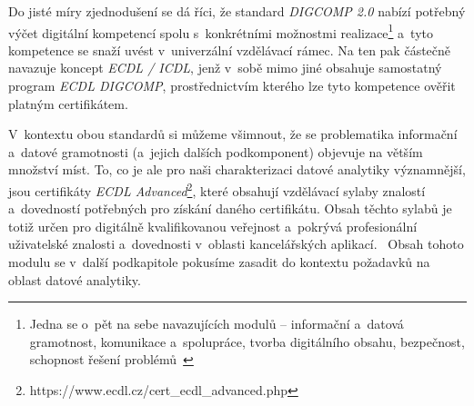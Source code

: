 Do jisté míry zjednodušení se dá říci, že standard \emph{DIGCOMP 2.0} nabízí potřebný výčet digitální kompetencí spolu s~konkrétními možnostmi realizace\footnote{Jedna se o~pět na sebe navazujících modulů – informační a~datová gramotnost, komunikace a~spolupráce, tvorba digitálního obsahu, bezpečnost, schopnost řešení problémů~\parencite{digicomp17}} a~tyto kompetence se snaží uvést v~univerzální vzdělávací rámec. Na ten pak částečně navazuje koncept \emph{ECDL / ICDL}, jenž v~sobě mimo jiné obsahuje samostatný program \emph{ECDL DIGCOMP}, prostřednictvím kterého lze tyto kompetence ověřit platným certifikátem.~\parencite{chabera21}

V~kontextu obou standardů si můžeme všimnout, že se problematika informační a~datové gramotnosti (a~jejich dalších podkomponent) objevuje na větším množství míst. To, co je ale pro naši charakterizaci datové analytiky významnější, jsou certifikáty \emph{ECDL Advanced}\footnote{https://www.ecdl.cz/cert\_ecdl\_advanced.php}, které obsahují vzdělávací sylaby znalostí a~dovedností potřebných pro získání daného certifikátu. Obsah těchto sylabů je totiž určen pro digitálně kvalifikovanou veřejnost a~pokrývá profesionální uživatelské znalosti a~dovednosti v~oblasti kancelářských aplikací.~\parencite{ecdl17} Obsah tohoto modulu se v~další podkapitole pokusíme zasadit do kontextu požadavků na oblast datové analytiky.
